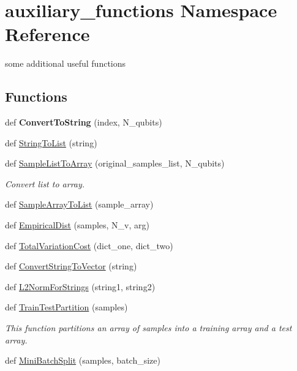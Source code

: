 \hypertarget{namespaceauxiliary__functions}{}\section{auxiliary\+\_\+functions Namespace Reference}
\label{namespaceauxiliary__functions}


some additional useful functions  


\subsection*{Functions}
\begin{DoxyCompactItemize}
\item 
\mbox{\label{namespaceauxiliary__functions_a75e3ea6f66138e5a56e5aaa6a96b8600}} 
def {\bfseries Convert\+To\+String} (index, N\+\_\+qubits)
\item 
def \hyperlink{namespaceauxiliary__functions_ad0cee6281437348f8a5856495772f65d}{String\+To\+List} (string)
\item 
def \hyperlink{namespaceauxiliary__functions_af7a04a13c92d95c0d77c001b10fab894}{Sample\+List\+To\+Array} (original\+\_\+samples\+\_\+list, N\+\_\+qubits)
\begin{DoxyCompactList}\small\item\em Convert list to array. \end{DoxyCompactList}\item 
def \hyperlink{namespaceauxiliary__functions_a9338b2da58eea385c1e9d9d1f956867d}{Sample\+Array\+To\+List} (sample\+\_\+array)
\item 
def \hyperlink{namespaceauxiliary__functions_a65d08dfca6f21d777715ab4a24ba5e11}{Empirical\+Dist} (samples, N\+\_\+v, arg)
\item 
def \hyperlink{namespaceauxiliary__functions_ac81c85ec5da8c152fd9c646f85ecc0bf}{Total\+Variation\+Cost} (dict\+\_\+one, dict\+\_\+two)
\item 
def \hyperlink{namespaceauxiliary__functions_a32a6214120a3c44697fa73f31352f2b7}{Convert\+String\+To\+Vector} (string)
\item 
def \hyperlink{namespaceauxiliary__functions_a6c2ed3da4759f13ac407997c85313b31}{L2\+Norm\+For\+Strings} (string1, string2)
\item 
def \hyperlink{namespaceauxiliary__functions_a4f7400968718917f204b573f72a0a883}{Train\+Test\+Partition} (samples)
\begin{DoxyCompactList}\small\item\em This function partitions an array of samples into a training array and a test array. \end{DoxyCompactList}\item 
def \hyperlink{namespaceauxiliary__functions_afdaed4d363ed08c291ca6b32bbc2ea77}{Mini\+Batch\+Split} (samples, batch\+\_\+size)
\end{DoxyCompactItemize}


